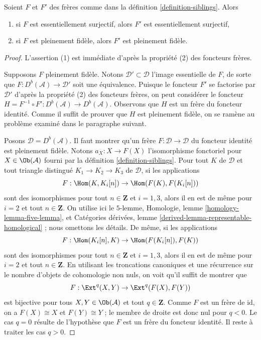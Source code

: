 \begin{lemma}
\label{lemma-sibling-faithful}
Soient $F$ et $F'$ des frères comme dans la définition \ref{definition-siblings}.
Alors
\begin{enumerate}
\item si $F$ est essentiellement surjectif, alors $F'$ est essentiellement
surjectif,
\item si $F$ est pleinement fidèle, alors $F'$ est pleinement fidèle.
\end{enumerate}
\end{lemma}

\begin{proof}
L'assertion (1) est immédiate d'après la propriété (2) des foncteurs frères.

\medskip\noindent
Supposons $F$ pleinement fidèle. Notons $\mathcal{D}' \subset \mathcal{D}$
l'image essentielle de $F$, de sorte que $F : D^b(\mathcal{A}) \to \mathcal{D}'$
soit une équivalence. Puisque le foncteur $F'$ se factorise par $\mathcal{D}'$
d'après la propriété (2) des foncteurs frères, on peut considérer le foncteur
$H = F^{-1} \circ F' : D^b(\mathcal{A}) \to D^b(\mathcal{A})$.
Observons que $H$ est un frère du foncteur identité.
Comme il suffit de prouver que $H$ est pleinement fidèle,
on se ramène au problème examiné dans le paragraphe suivant.

\medskip\noindent
Posons $\mathcal{D} = D^b(\mathcal{A})$. Il faut montrer qu'un frère
$F : \mathcal{D} \to \mathcal{D}$ du foncteur identité est pleinement fidèle.
Notons $a_X : X \to F(X)$ l'isomorphisme fonctoriel pour
$X \in \Ob(\mathcal{A})$ fourni par la définition \ref{definition-siblings}.
Pour tout $K$ de $\mathcal{D}$ et tout triangle distingué
$K_1 \to K_2 \to K_3$ de $\mathcal{D}$,
si les applications
$$
F : \Hom(K, K_i[n]) \to \Hom(F(K), F(K_i[n]))
$$
sont des isomorphismes pour tout $n \in \mathbf{Z}$ et $i = 1, 3$, alors il en
est de même pour $i = 2$ et tout $n \in \mathbf{Z}$. On utilise ici
le $5$-lemme, Homologie, lemme \ref{homology-lemma-five-lemma}, et
Catégories dérivées, lemme \ref{derived-lemma-representable-homological} ;
nous omettons les détails. De même, si les applications
$$
F : \Hom(K_i[n], K) \to \Hom(F(K_i[n]), F(K))
$$
sont des isomorphismes pour tout $n \in \mathbf{Z}$ et $i = 1, 3$, alors il en
est de même pour $i = 2$ et tout $n \in \mathbf{Z}$. En utilisant les troncations
canoniques et une récurrence sur le nombre d'objets de cohomologie non nuls,
on voit qu'il suffit de montrer que
$$
F : \Ext^q(X, Y) \to \Ext^q(F(X), F(Y))
$$
est bijective pour tous $X, Y \in \Ob(\mathcal{A})$ et tout $q \in \mathbf{Z}$.
Comme $F$ est un frère de $\text{id}$, on a $F(X) \cong X$ et
$F(Y) \cong Y$ ; le membre de droite est donc nul pour $q < 0$.
Le cas $q = 0$ résulte de l'hypothèse que $F$ est un frère du
foncteur identité. Il reste à traiter les cas $q > 0$.


\end{proof}
